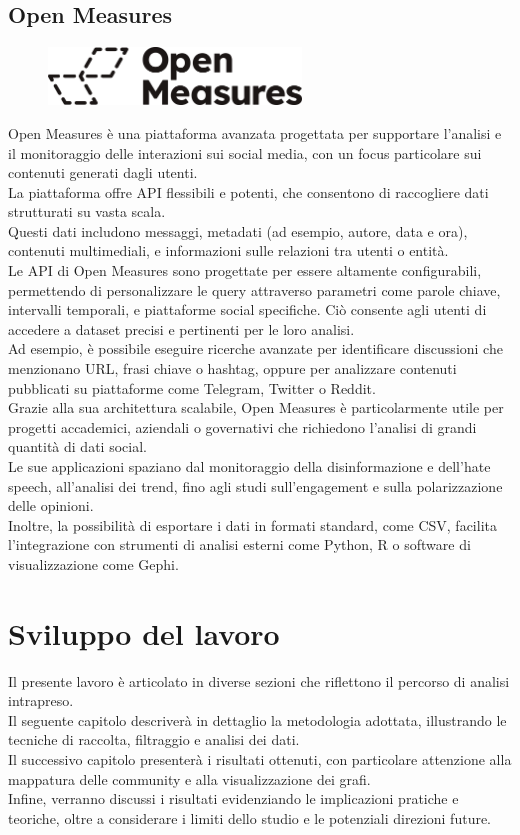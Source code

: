 \documentclass[12pt]{article}
\begin{document}
	\subsection{Open Measures}
	\begin{figure}[H]
		\centering
		\includegraphics[width=0.6\textwidth]{immagini/openmeasures}
	\end{figure}
	Open Measures è una piattaforma avanzata progettata per supportare l'analisi e il monitoraggio delle interazioni sui social media, con un focus particolare sui contenuti generati dagli utenti.\\
	La piattaforma offre API flessibili e potenti, che consentono di raccogliere dati strutturati su vasta scala.\\
	Questi dati includono messaggi, metadati (ad esempio, autore, data e ora), contenuti multimediali, e informazioni sulle relazioni tra utenti o entità.
	\\
	Le API di Open Measures sono progettate per essere altamente configurabili, permettendo di personalizzare le query attraverso parametri come parole chiave, intervalli temporali, e piattaforme social specifiche. Ciò consente agli utenti di accedere a dataset precisi e pertinenti per le loro analisi.\\ 
	Ad esempio, è possibile eseguire ricerche avanzate per identificare discussioni che menzionano URL, frasi chiave o hashtag, oppure per analizzare contenuti pubblicati su piattaforme come Telegram, Twitter o Reddit.
	\\
	Grazie alla sua architettura scalabile, Open Measures è particolarmente utile per progetti accademici, aziendali o governativi che richiedono l'analisi di grandi quantità di dati social.\\ 
	Le sue applicazioni spaziano dal monitoraggio della disinformazione e dell'hate speech, all'analisi dei trend, fino agli studi sull'engagement e sulla polarizzazione delle opinioni.\\ 
	Inoltre, la possibilità di esportare i dati in formati standard, come CSV, facilita l'integrazione con strumenti di analisi esterni come Python, R o software di visualizzazione come Gephi.
	\newpage
	\section{Sviluppo del lavoro}
	Il presente lavoro è articolato in diverse sezioni che riflettono il percorso di analisi intrapreso.\\
	Il seguente capitolo descriverà in dettaglio la metodologia adottata, illustrando le tecniche di raccolta, filtraggio e analisi dei dati.\\
	Il successivo capitolo presenterà i risultati ottenuti, con particolare attenzione alla mappatura delle community e alla visualizzazione dei grafi.\\
	Infine, verranno discussi i risultati evidenziando le implicazioni pratiche e teoriche, oltre a considerare i limiti dello studio e le potenziali direzioni future.
\end{document}
